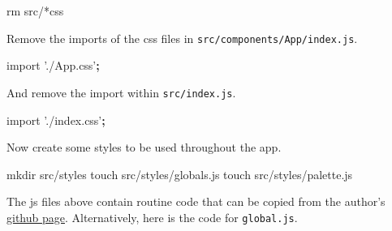 \documentclass[]{book}
\newenvironment{Shaded}{\begin{snugshade}}{\end{snugshade}}
\newcommand{\ExtensionTok}[1]{#1}
\newcommand{\FunctionTok}[1]{\textcolor[rgb]{0.00,0.00,0.00}{#1}}
\newcommand{\KeywordTok}[1]{\textcolor[rgb]{0.13,0.29,0.53}{\textbf{#1}}}
\newcommand{\NormalTok}[1]{#1}
\newcommand{\StringTok}[1]{\textcolor[rgb]{0.31,0.60,0.02}{#1}}
\begin{document}
\begin{Shaded}
\begin{Highlighting}[]
\FunctionTok{rm}\NormalTok{ src/*css}
\end{Highlighting}
\end{Shaded}

Remove the imports of the css files in \texttt{src/components/App/index.js}.

\begin{Shaded}
\begin{Highlighting}[]
\ExtensionTok{import} \StringTok{'./App.css'}\KeywordTok{;}
\end{Highlighting}
\end{Shaded}

And remove the import within \texttt{src/index.js}.

\begin{Shaded}
\begin{Highlighting}[]
\ExtensionTok{import} \StringTok{'./index.css'}\KeywordTok{;}
\end{Highlighting}
\end{Shaded}

Now create some styles to be used throughout the app.

\begin{Shaded}
\begin{Highlighting}[]
\FunctionTok{mkdir}\NormalTok{ src/styles}
\FunctionTok{touch}\NormalTok{ src/styles/globals.js}
\FunctionTok{touch}\NormalTok{ src/styles/palette.js}
\end{Highlighting}
\end{Shaded}

The js files above contain routine code that can be copied from the author's \href{https://github.com/treyhuffine/hn-clone}{github page}.
Alternatively, here is the code for \texttt{global.js}.
\end{document}

